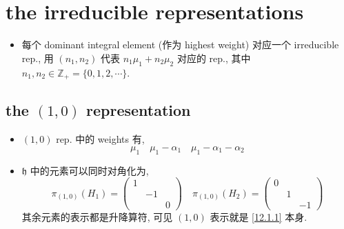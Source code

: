 \section{the irreducible representations}
\begin{itemize}
	\item 每个 dominant integral element (作为 highest weight) 对应一个 irreducible rep., 用 $(n_1, n_2)$ 代表 $n_1 \mu_1 + n_2 \mu_2$ 对应的 rep., 其中 $n_1, n_2 \in \mathbb{Z}_+ = \{0, 1, 2, \cdots\}$.
\end{itemize}

\subsection{the \texorpdfstring{$(1, 0)$}{(1, 0)} representation}
\begin{itemize}
	\item $(1, 0)$ rep. 中的 weights 有,
	\begin{equation}
		\mu_1 \quad \mu_1 - \alpha_1 \quad \mu_1 - \alpha_1 - \alpha_2
	\end{equation}
	
	\item $\mathfrak{h}$ 中的元素可以同时对角化为,
	\begin{equation}
		\pi_{(1, 0)}(H_1) = \begin{pmatrix}
			1 & & \\
			& - 1 & \\
			& & 0
		\end{pmatrix} \quad \pi_{(1, 0)}(H_2) = \begin{pmatrix}
			0 & & \\
			& 1 & \\
			& & - 1
		\end{pmatrix}
	\end{equation}
	其余元素的表示都是升降算符, 可见 $(1, 0)$ 表示就是 \eqref{12.1.1} 本身.
\end{itemize}

